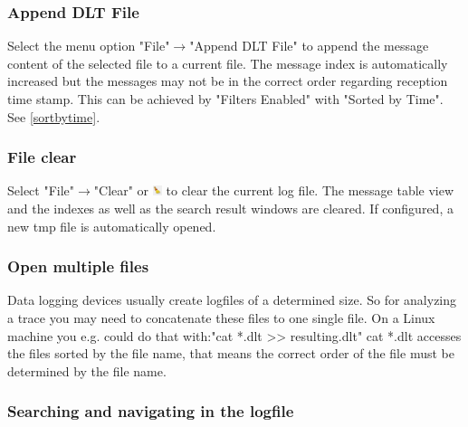 \documentclass[a4paper,11pt]{article}
\begin{document}
\subsubsection{Append DLT File}
Select the menu option "File"\ensuremath{\rightarrow}"Append DLT File" to append the message content of the
selected file to a current file.
The message index is automatically increased but the messages may not be in the correct order regarding reception time stamp.
This can be achieved by "Filters Enabled" with "Sorted by Time". See \autoref{sortbytime}.

\subsubsection{File clear}
Select "File"\ensuremath{\rightarrow}"Clear" or \includegraphics[width=0.02\textwidth]{images/clean_icon.png}
to clear the current log file. The message table view and the indexes as well as the search result windows are cleared.
If configured, a new tmp file is automatically opened.

\subsubsection{Open multiple files}

Data logging devices usually create logfiles of a determined size. So for analyzing a trace you may need to concatenate
these files to one single file. On a Linux machine you e.g. could do that with:\linebreak "cat *.dlt >> resulting.dlt"\linebreak
cat *.dlt accesses the files sorted by the file name, that means the correct order of the file must be determined
by the file name.

\subsubsection{Searching and navigating in the logfile}
\end{document}
